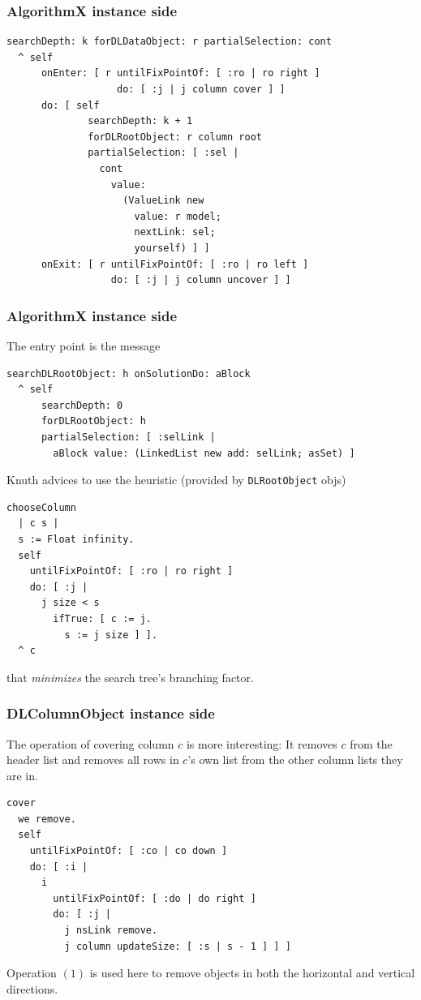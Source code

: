\documentclass[10pt]{beamer}
\begin{document}
\begin{frame}[fragile]
\frametitle{AlgorithmX instance side}
\begin{verbatim}
searchDepth: k forDLDataObject: r partialSelection: cont
  ^ self
      onEnter: [ r untilFixPointOf: [ :ro | ro right ] 
                   do: [ :j | j column cover ] ]
      do: [ self
              searchDepth: k + 1
              forDLRootObject: r column root
              partialSelection: [ :sel | 
                cont
                  value:
                    (ValueLink new
                      value: r model;
                      nextLink: sel;
                      yourself) ] ]
      onExit: [ r untilFixPointOf: [ :ro | ro left ] 
                  do: [ :j | j column uncover ] ]
\end{verbatim}
\end{frame}

\begin{frame}[fragile]
\frametitle{AlgorithmX instance side}
The entry point is the message
\vfill
\begin{verbatim}
searchDLRootObject: h onSolutionDo: aBlock
  ^ self
      searchDepth: 0
      forDLRootObject: h
      partialSelection: [ :selLink | 
        aBlock value: (LinkedList new add: selLink; asSet) ]
\end{verbatim}
\vfill
Knuth advices to use the heuristic (provided by \texttt{DLRootObject} objs)
\begin{verbatim}
chooseColumn
  | c s |
  s := Float infinity.
  self
    untilFixPointOf: [ :ro | ro right ]
    do: [ :j | 
      j size < s
        ifTrue: [ c := j.
          s := j size ] ].
  ^ c
\end{verbatim}
that \textit{minimizes} the search tree's branching factor.
\end{frame}

\begin{frame}[fragile]
\frametitle{DLColumnObject instance side}
The operation of covering column $c$ is more interesting: 
It removes $c$ from the header list and removes all rows in $c$'s own list 
from the other column lists they are in.
\vfill
\begin{verbatim}
cover
  we remove.
  self
    untilFixPointOf: [ :co | co down ]
    do: [ :i | 
      i
        untilFixPointOf: [ :do | do right ]
        do: [ :j | 
          j nsLink remove.
          j column updateSize: [ :s | s - 1 ] ] ]
\end{verbatim}
\vfill
Operation $(1)$ is used here to remove objects in both the horizontal and vertical directions.
\end{frame}
\end{document}
